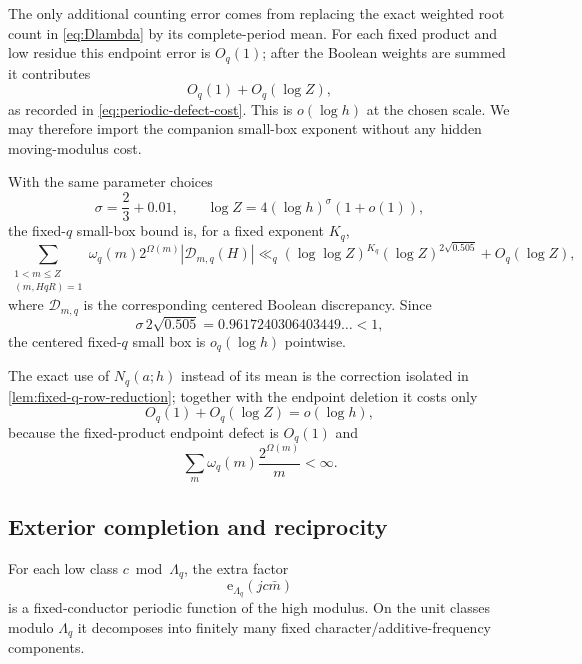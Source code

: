\documentclass[11pt]{article}
\theoremstyle{definition}
\theoremstyle{remark}
\newcommand{\1}{\mathbf 1}
\newcommand{\e}{\mathrm e}
\newcommand{\Om}{\Omega}
\newcommand{\Dcal}{\mathcal D}
\begin{document}
The only additional counting error comes from replacing the exact weighted root count in \eqref{eq:Dlambda} by its complete-period mean.  For each fixed product and low residue this endpoint error is $O_q(1)$; after the Boolean weights are summed it contributes
\[
O_q(1)+O_q(\log Z),
\]
as recorded in \eqref{eq:periodic-defect-cost}.  This is $o(\log h)$ at the chosen scale.  We may therefore import the companion small-box exponent without any hidden moving-modulus cost.

With the same parameter choices
\[
\sigma=\frac23+0.01,
\qquad
\log Z=4(\log h)^\sigma(1+o(1)),
\]
the fixed-$q$ small-box bound is, for a fixed exponent $K_q$,
\begin{equation}\label{eq:fixed-q-smallbox}
\sum_{\substack{1<m\le Z\\(m,HqR)=1}}
\omega_q(m)2^{\Om(m)}|\Dcal_{m,q}(H)|
\ll_q
(\log\log Z)^{K_q}(\log Z)^{2\sqrt{0.505}}
+O_q(\log Z),
\end{equation}
where $\Dcal_{m,q}$ is the corresponding centered Boolean discrepancy.  Since
\begin{equation}\label{eq:exponent}
\sigma\,2\sqrt{0.505}
=0.9617240306403449\ldots<1,
\end{equation}
the centered fixed-$q$ small box is $o_q(\log h)$ pointwise.

The exact use of $N_q(a;h)$ instead of its mean is the correction isolated in
\cref{lem:fixed-q-row-reduction}; together with the endpoint deletion it costs only
\begin{equation}\label{eq:periodic-defect-cost}
O_q(1)+O_q(\log Z)=o(\log h),
\end{equation}
because the fixed-product endpoint defect is $O_q(1)$ and
\[
\sum_m\omega_q(m)\frac{2^{\Om(m)}}m<\infty.
\]

\subsection{Exterior completion and reciprocity}

For each low class $c\bmod\Lambda_q$, the extra factor
\[
\e_{\Lambda_q}(jc\bar m)
\]
is a fixed-conductor periodic function of the high modulus.  On the unit classes modulo $\Lambda_q$ it decomposes into finitely many fixed character/additive-frequency components.
\end{document}
